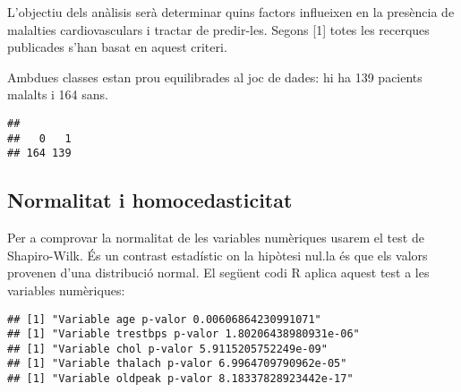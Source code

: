 \documentclass[12,]{article}
\newenvironment{Shaded}{\begin{snugshade}}{\end{snugshade}}
\newcommand{\ControlFlowTok}[1]{\textcolor[rgb]{0.13,0.29,0.53}{\textbf{#1}}}
\newcommand{\KeywordTok}[1]{\textcolor[rgb]{0.13,0.29,0.53}{\textbf{#1}}}
\newcommand{\NormalTok}[1]{#1}
\newcommand{\OperatorTok}[1]{\textcolor[rgb]{0.81,0.36,0.00}{\textbf{#1}}}
\newcommand{\StringTok}[1]{\textcolor[rgb]{0.31,0.60,0.02}{#1}}
\begin{document}
L'objectiu dels anàlisis serà determinar quins factors influeixen en la
presència de malalties cardiovasculars i tractar de predir-les. Segons
{[}1{]} totes les recerques publicades s'han basat en aquest criteri.

Ambdues classes estan prou equilibrades al joc de dades: hi ha 139
pacients malalts i 164 sans.

\begin{Shaded}
\end{Shaded}

\begin{verbatim}
## 
##   0   1 
## 164 139
\end{verbatim}

\hypertarget{normalitat-i-homocedasticitat}{%
\subsection{Normalitat i
homocedasticitat}\label{normalitat-i-homocedasticitat}}

Per a comprovar la normalitat de les variables numèriques usarem el test
de Shapiro-Wilk. És un contrast estadístic on la hipòtesi nul.la és que
els valors provenen d'una distribució normal. El següent codi R aplica
aquest test a les variables numèriques:

\begin{Shaded}
\end{Shaded}

\begin{verbatim}
## [1] "Variable age p-valor 0.00606864230991071"
## [1] "Variable trestbps p-valor 1.80206438980931e-06"
## [1] "Variable chol p-valor 5.9115205752249e-09"
## [1] "Variable thalach p-valor 6.9964709790962e-05"
## [1] "Variable oldpeak p-valor 8.18337828923442e-17"
\end{verbatim}
\end{document}
